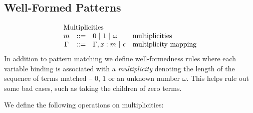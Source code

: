 \documentclass{article}
\makeatletter
\newcommand{\lbls}{\ensuremath{\mathit{lbls}}}
\newcommand{\pseq}[2]{\ensuremath{#1 \cdot #2}}
\newcommand{\por}[2]{\ensuremath{#1/#2}}
\newcommand{\children}[2]{\ensuremath{#1} \Downarrow #2}
\newcommand{\pnot}[1]{\ensuremath{\lnot #1}}
\newcommand{\maybe}[1]{\ensuremath{#1?}}
\newcommand{\many}[1]{\ensuremath{#1^*}}
\newcommand{\any}{\ensuremath{\text{\underline{\hspace{0.6em}}}}}
\newcommand{\bind}[2]{\ensuremath{#1@#2}}
\newcommand{\paction}[2]{\ensuremath{#1\mathop{\circ} #2}}
\newcommand{\arrayheading}[2]{\multicolumn{#1}{l}{\mbox{#2}}}
\makeatother
\begin{document}
\subsection{Well-Formed Patterns}
\[
  \begin{array}{crll}
    \arrayheading{4}{Multiplicities}\\
    m      & ::= & 0 ~|~ 1 ~|~ \omega & \text{multiplicities}\\
    \Gamma & ::= & \Gamma, x : m ~|~ \epsilon & \text{multiplicity mapping}\\
  \end{array}
\]
%
In addition to pattern matching we define well-formedness rules
where each variable binding is associated with a
\emph{multiplicity} denoting the length of the sequence of terms
matched -- $0$, $1$ or an unknown number $\omega$. This helps rule
out some bad cases, such as taking the children of zero terms.



We define the following operations on multiplicities:
\end{document}
